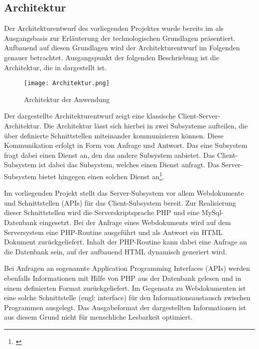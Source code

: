 \subsection{Architektur}
\label{sec:Architektur}

Der Architekturentwurf des vorliegenden Projektes wurde bereits im
 als Ausgangsbasis zur Erläuterung der
technologischen Grundlagen präsentiert. Aufbauend auf diesen Grundlagen wird der
Architekturentwurf im Folgenden genauer betrachtet. Ausgangspunkt der folgenden
Beschriebung ist die Architektur, die in  dargestellt
ist.

\begin{figure}[htb]
\centering
\texttt{[image: Architektur.png]}
\caption[Architektur der Anwendung]{Architektur der
Anwendung\protect\footnotemark}
\label{fig:Architektur}
\end{figure}

Der dargestellte Architekturentwurf zeigt eine klassische
Client-Server-Architektur. Die Architektur lässt sich hierbei in zwei
Subsysteme aufteilen, die über definierte Schnittstellen
miteinander kommunizieren können. Diese Kommunikation erfolgt in Form von
Anfrage und Antwort. Das eine Subsystem fragt dabei einen Dienst an, den das
andere Subsystem anbietet. Das Client-Subsystem ist dabei das Subsystem, welches
einen Dienst anfragt. Das Server-Subsystem bietet hingegen einen solchen
Dienst an\footnote{\citet[S.~177]{rautenstrauch2002}}.

Im vorliegenden Projekt stellt das Server-Subsystem vor allem Webdokumente und
Schnittstellen (APIs) für das Client-Subsystem bereit. Zur Realisierung dieser
Schnittstellen wird die Serverskriptsprache PHP und eine MySql-Datenbank
eingesetzt. Bei der Anfrage eines Webdokuments wird auf dem Serversystem eine
PHP-Routine ausgeführt und als Antwort ein HTML Dokument zurückgeliefert.
Inhalt der PHP-Routine kann dabei eine Anfrage an die Datenbank sein, auf der
aufbauend HTML dynamisch generiert wird.

Bei Anfragen an sogenannte Application Programming Interfaces (APIs) werden
ebenfalls Informationen mit Hilfe von PHP aus der Datenbank gelesen und in
einem definierten Format zurückgeliefert. Im Gegensatz zu Webdokumenten ist
eine solche Schnittstelle (engl: interface) für den Informationsaustausch
zwischen Programmen ausgelegt. Das Ausgabeformat der dargestellten Informationen
ist aus diesem Grund nicht für menschliche Lesbarkeit optimiert.

